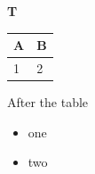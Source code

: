 \documentclass[11pt,a4paper]{article}
\begin{document}
\textbf{T}

\begin{table}[h]
\begin{tabular}{|l|l|}
\hline
A & B \\ \hline
1 & 2 \\ \hline
\end{tabular}
\end{table}

After the table

\begin{itemize}
\item one
\item two
\end{itemize}
\end{document}
